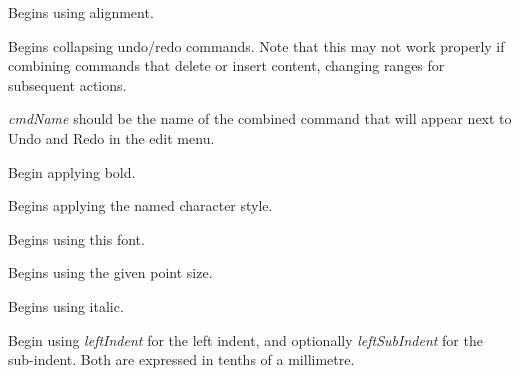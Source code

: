 \label{wxrichtextbufferbeginalignment}


Begins using alignment.

\label{wxrichtextbufferbeginbatchundo}


Begins collapsing undo/redo commands. Note that this may not work properly
if combining commands that delete or insert content, changing ranges for
subsequent actions.

{\it cmdName} should be the name of the combined command that will appear
next to Undo and Redo in the edit menu.

\label{wxrichtextbufferbeginbold}


Begin applying bold.

\label{wxrichtextbufferbegincharacterstyle}


Begins applying the named character style.

\label{wxrichtextbufferbeginfont}


Begins using this font.

\label{wxrichtextbufferbeginfontsize}


Begins using the given point size.

\label{wxrichtextbufferbeginitalic}


Begins using italic.

\label{wxrichtextbufferbeginleftindent}


Begin using {\it leftIndent} for the left indent, and optionally {\it leftSubIndent} for
the sub-indent. Both are expressed in tenths of a millimetre.

